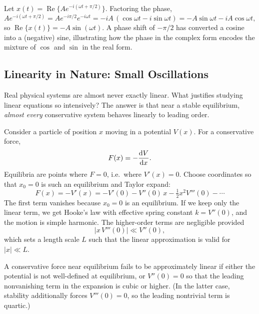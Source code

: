 \begin{example}
Let $x(t) = \operatorname{Re}\{A e^{-i(\omega t + \pi/2)}\}$. Factoring the phase,
\begin{equation}
    A e^{-i(\omega t + \pi/2)} = A e^{-i\pi/2} e^{-i\omega t} = -iA\,(\cos\omega t - i\sin\omega t) = -A\sin\omega t - iA\cos\omega t,
\end{equation}
so $\operatorname{Re}\{x(t)\} = -A\sin(\omega t)$. A phase shift of $-\pi/2$ has converted a cosine into a (negative) sine, illustrating how the phase in the complex form encodes the mixture of $\cos$ and $\sin$ in the real form.
\end{example}

\subsection{Linearity in Nature: Small Oscillations}

Real physical systems are almost never exactly linear. What justifies studying linear equations so intensively? The answer is that near a stable equilibrium, \emph{almost every} conservative system behaves linearly to leading order.

Consider a particle of position $x$ moving in a potential $V(x)$. For a conservative force,
\begin{equation}
    F(x) = -\dv{V}{x}.
\end{equation}
Equilibria are points where $F = 0$, i.e.\ where $V'(x) = 0$. Choose coordinates so that $x_0 = 0$ is such an equilibrium and Taylor expand:
\begin{equation}
    F(x) = -V'(x) = -V'(0) - V''(0)\,x - \tfrac{1}{2} x^2 V'''(0) - \cdots
\end{equation}
The first term vanishes because $x_0 = 0$ is an equilibrium. If we keep only the linear term, we get Hooke's law with effective spring constant $k = V''(0)$, and the motion is simple harmonic. The higher-order terms are negligible provided
\begin{equation}
    |x\,V'''(0)| \ll V''(0),
\end{equation}
which sets a length scale $L$ such that the linear approximation is valid for $|x| \ll L$.

\begin{fact}
A conservative force near equilibrium fails to be approximately linear if either the potential is not well-defined at equilibrium, or $V''(0) = 0$ so that the leading nonvanishing term in the expansion is cubic or higher. (In the latter case, stability additionally forces $V'''(0) = 0$, so the leading nontrivial term is quartic.)
\end{fact}

